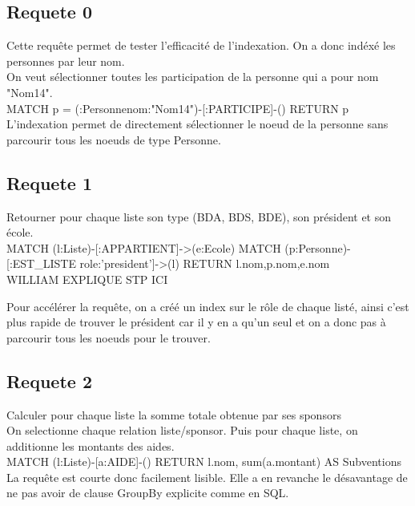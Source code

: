 \documentclass[a4paper,oneside,1pt]{article}
\begin{document}
\subsection{Requete 0}
Cette requête permet de tester l'efficacité de l'indexation. On a donc indéxé les personnes par leur nom.
\\
On veut sélectionner toutes les participation de la personne qui a pour nom "Nom14". 
\\
MATCH p = (:Personne{nom:"Nom14"})-[:PARTICIPE]-() RETURN p
\\L'indexation permet de directement sélectionner le noeud de la personne sans parcourir tous les noeuds de type Personne.

\subsection{Requete 1}
Retourner pour chaque liste son type (BDA, BDS, BDE), son président et son école.
\\
MATCH (l:Liste)-[:APPARTIENT]->(e:Ecole)
MATCH (p:Personne)-[:EST\_LISTE {role:'president'}]->(l)
RETURN l.nom,p.nom,e.nom
\\WILLIAM EXPLIQUE STP ICI

Pour accélérer la requête, on a créé un index sur le rôle de chaque listé, ainsi c'est plus rapide de trouver le président car il y en a qu'un seul et on a donc pas à parcourir tous les noeuds pour le trouver.


\subsection{Requete 2}
Calculer pour chaque liste la somme totale obtenue par ses sponsors
\\
On selectionne chaque relation liste/sponsor. Puis pour chaque liste, on additionne les montants des aides.
\\
MATCH (l:Liste)-[a:AIDE]-() 
RETURN l.nom, sum(a.montant) AS Subventions
\\
La requête est courte donc facilement lisible. Elle a en revanche le désavantage de ne pas avoir de clause GroupBy explicite comme en SQL.
\end{document}
